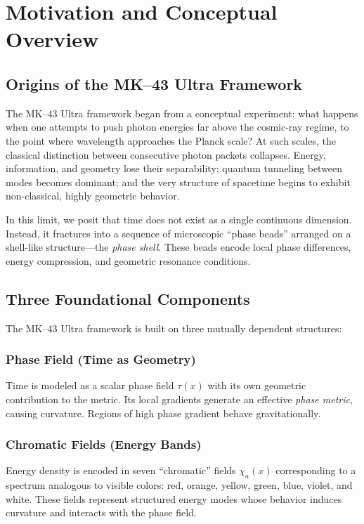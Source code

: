\chapter{Motivation and Conceptual Overview}

\section{Origins of the MK--43 Ultra Framework}

The MK--43 Ultra framework began from a conceptual experiment: 
what happens when one attempts to push photon energies far above the cosmic-ray regime, to the point where wavelength approaches the Planck scale? 
At such scales, the classical distinction between consecutive photon packets collapses. 
Energy, information, and geometry lose their separability; quantum tunneling between modes becomes dominant; and the very structure of spacetime begins to exhibit non-classical, highly geometric behavior.

In this limit, we posit that time does not exist as a single continuous dimension. 
Instead, it fractures into a sequence of microscopic ``phase beads'' arranged on a shell-like structure---the \emph{phase shell}. 
These beads encode local phase differences, energy compression, and geometric resonance conditions.

\section{Three Foundational Components}

The MK--43 Ultra framework is built on three mutually dependent structures:

\subsection{Phase Field (Time as Geometry)}
Time is modeled as a scalar phase field $\tau(x)$ with its own geometric contribution to the metric. 
Its local gradients generate an effective \emph{phase metric}, causing curvature. 
Regions of high phase gradient behave gravitationally.

\subsection{Chromatic Fields (Energy Bands)}
Energy density is encoded in seven ``chromatic'' fields $\chi_a(x)$ corresponding to a spectrum analogous to visible colors: 
red, orange, yellow, green, blue, violet, and white. 
These fields represent structured energy modes whose behavior induces curvature and interacts with the phase field.

